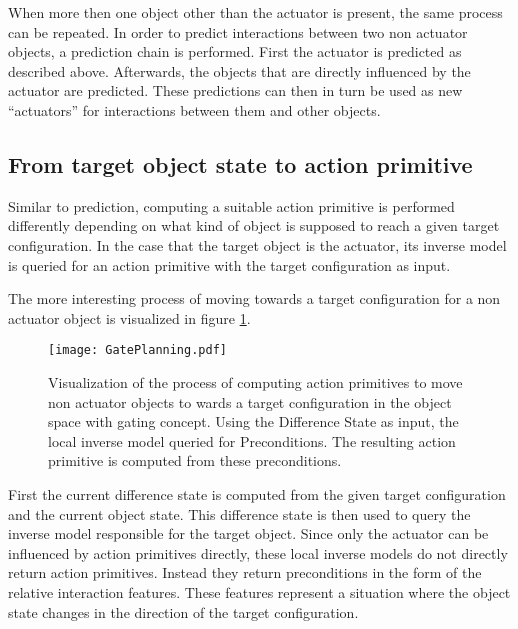 When more then one object other than the actuator is present, the same process can be repeated. In order to predict interactions between two non actuator objects, a prediction chain is performed. First the actuator is predicted as described above. Afterwards, the objects that are directly influenced by the actuator are predicted. These predictions can then in turn be used as new \enquote{actuators} for interactions between them and other objects. %


\subsection{From target object state to action primitive \label{sec:gatePlanning}}

Similar to prediction, computing a suitable action primitive is performed differently depending on what kind of object is supposed to reach a given target configuration. In the case that the target object is the actuator, its inverse model is queried for an action primitive with the target configuration as input. 

The more interesting process of moving towards a target configuration for a non actuator object is visualized in figure \ref{fig:GatePlanning}.

\begin{figure}
	\centering
	\texttt{[image: GatePlanning.pdf]}
	\caption{Visualization of the process of computing action primitives to move non actuator objects to wards a target configuration in the object space with gating concept. Using the Difference State as input, the local inverse model queried for Preconditions. The resulting action primitive is computed from these preconditions.}
		\label{fig:GatePlanning}
\end{figure}
	
First the current difference state is computed from the given target configuration and the current object state. This difference state is then used to query the inverse model responsible for the target object. Since only the actuator can be influenced by action primitives directly, these local inverse models do not directly return action primitives. Instead they return preconditions in the form of the relative interaction features. These features represent a situation where the object state changes in the direction of the target configuration. 
	
